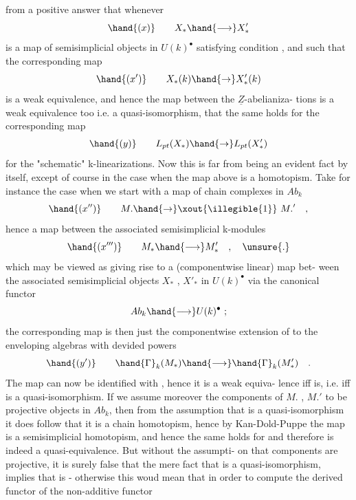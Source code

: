 
from a positive answer that whenever
\[ \hand{(x)} \qquad X_* \hand{\longrightarrow} X'_* \]
is a map of semisimplicial objects in $U(k)^\bullet$ satisfying condition ,
and such that the corresponding map
\[ \hand{(x')} \qquad X_*(k) \hand{\to} X'_*(k) \]
is a weak equivalence, and  hence the map between the $\underline{Z}$-abelianiza-%
tions is a weak equivalence too i.e. a quasi-isomorphism, that the same
holds for the corresponding map
\[ \hand{(y)} \qquad L_{pt}(X_*) \hand{\to} L_{pt}(X'_*) \]
for the "schematic" k-linearizations. Now this is far from being an
evident fact by itself, except of course in the case when the map 
above is a homotopism. Take for instance the case when we start with
a map of chain complexes in $Ab_k$
\[ \hand{(x'')} \qquad M. \hand{\to} \text{\xout{\illegible{1}}}\ M.' \quad , \]
hence a map between the associated semisimplicial k-modules
\[ \hand{(x''')} \qquad M_* \hand{\longrightarrow} M'_* \quad , \quad \unsure{.} \]
which may be viewed as giving rise to a (componentwise linear) map bet-%
ween the associated semisimplicial objects $X_*$ , $X'_*$ in $U(k)^\bullet$ via the
canonical functor
\[ Ab_k \hand{\longrightarrow} U(k)^\bullet \ ; \]
the corresponding map  is then just the componentwise extension of
 to the enveloping algebras with devided powers
\[ \hand{(y')} \qquad \hand{\Gamma}_k(M_*) \hand{\longrightarrow} \hand{\Gamma}_k(M'_*) \quad . \]
The map  can now be identified with  , hence it is a weak equiva-%
lence iff  is, i.e. iff  is a quasi-isomorphism. If we assume
moreover the components of $M.$ ,  $M.'$ to be projective objects in $Ab_k$,
then from the assumption that  is a quasi-isomorphism it does follow
that it is a chain homotopism, hence by Kan-Dold-Puppe the map 
is a semisimplicial homotopism, and hence the same holds for \hand{,} and
 therefore is indeed a quasi-equivalence. But without the assumpti-%
on that components are projective, it is surely false that the mere
fact that  is a quasi-isomorphism, implies that  is - otherwise
this woud mean that in order to compute the  derived functor of the
non-additive functor 


